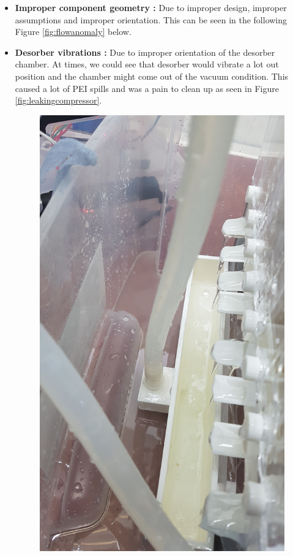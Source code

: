 \begin{itemize}
    \item \textbf{Improper component geometry :} Due to improper design, improper assumptions and improper orientation. This can be seen in the following Figure \ref{fig:flowanomaly} below.
    \item \textbf{Desorber vibrations :} Due to improper orientation of the desorber chamber. At times, we could see that desorber would vibrate a lot out position and the chamber might come out of the vacuum condition. This caused a lot of PEI spills and was a pain to clean up as seen in Figure \ref{fig:leakingcompressor}. 
    
    \begin{figure}[H]
        \centering
        \begin{minipage}{.5\textwidth}
        \centering
        \includegraphics[width=0.9\linewidth, angle = 270]{images/mywork/Sprint3/flowanomaly.jpg}

\end{minipage}
\end{figure}
\end{itemize}
